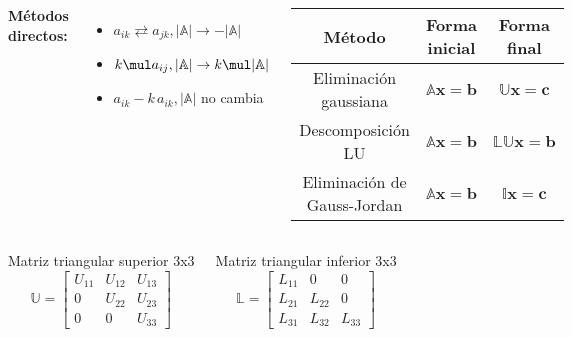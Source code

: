 \documentclass[9pt, aspectratio=169]{beamer}
\begin{document}
\begin{frame}
\begin{columns}[c]
\textbf{Métodos directos:}
\begin{itemize}
    \item $a_{ik} \rightleftarrows a_{jk}, |\mathbb{A}| \rightarrow -|\mathbb{A}|$
    \item $k \mul a_{ij}, |\mathbb{A}| \rightarrow k \mul |\mathbb{A}|$
    \item $a_{ik} - k \, a_{ik}, |\mathbb{A}|$ no cambia
\end{itemize} \pause
{}
 \begin{center}
\begin{tabular}{c c c}
\toprule
\textbf{Método} & \textbf{Forma inicial} & \textbf{Forma final} \\
\midrule
Eliminación gaussiana & $\mathbb{A} \mathbf{x} = \mathbf{b}$ & $\mathbb{U} \mathbf{x} = \mathbf{c}$ \\
Descomposición LU & $\mathbb{A} \mathbf{x} = \mathbf{b}$ & $ \mathbb{LU} \mathbf{x} = \mathbf{b}$ \\
Eliminación de Gauss-Jordan & $\mathbb{A} \mathbf{x} = \mathbf{b}$ & $\mathbb{I} \mathbf{x} = \mathbf{c}$ \\
\bottomrule
\end{tabular} 
\end{center}
\end{columns} \pause

\vspace{2em}

\begin{columns}[t]
 Matriz triangular superior 3x3
\[
    \mathbb{U} = \begin{bmatrix} 
 U_{11} & U_{12} &  U_{13} \\
 0      & U_{22} &  U_{23} \\
 0      & 0      &  U_{33}
 \end{bmatrix} 
\]

Matriz triangular inferior 3x3
\[
    \mathbb{L} = \begin{bmatrix} 
 L_{11} & 0      & 0 \\
 L_{21} & L_{22} & 0 \\
 L_{31} & L_{32} & L_{33}
 \end{bmatrix} \] 
\end{columns}
\end{frame}
\end{document}
